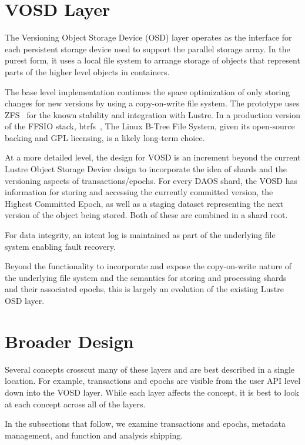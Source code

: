 \documentclass[conference]{IEEEtran} \pdfpagewidth=8.5in
\begin{document}
\section{VOSD Layer}
\label{sec:vosd}

The Versioning Object Storage Device (OSD) layer operates as the interface for
each persistent storage device used to support the parallel storage array. In
the purest form, it uses a local file system to arrange storage of objects that
represent parts of the higher level objects in containers.

The base level implementation continues the space optimization of only storing
changes for new versions by using a copy-on-write file system. The prototype
uses ZFS~\cite{zhang:2010:zfs} for the known stability and integration with
Lustre. In a production version of the FFSIO stack,
btrfs~\cite{rodeh:2013:btrfs}, The Linux B-Tree File System, given its
open-source backing and GPL licensing, is a likely long-term choice.

At a more detailed level, the design for VOSD is an increment beyond the
current Lustre Object Storage Device design to incorporate the idea of shards
and the versioning aspects of transactions/epochs. For every DAOS shard, the
VOSD has information for storing and accessing the currently committed version,
the Highest Committed Epoch, as well as a staging dataset representing the
next version of the object being stored. Both of these are combined in a shard
root.

For data integrity, an intent log is maintained as part of the underlying file
system enabling fault recovery.

Beyond the functionality to incorporate and expose the copy-on-write nature
of the underlying file system and the semantics for storing and processing
shards and their associated epochs, this is largely an evolution of the
existing Lustre OSD layer.

\section{Broader Design}
\label{sec:broader}

Several concepts crosscut many of these layers and are best described in a
single location. For example, transactions and epochs are visible from the
user API level down into the VOSD layer. While each layer affects the concept,
it is best to look at each concept across all of the layers.

In the subsections that follow, we examine transactions and epochs, metadata
management, and function and analysis shipping.
\end{document}
